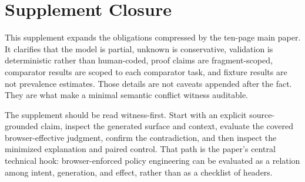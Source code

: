 \documentclass[10pt,conference]{IEEEtran}
\begin{document}
\section{Supplement Closure}

This supplement expands the obligations compressed by the ten-page main paper. It clarifies that the model is partial, unknown is conservative, validation is deterministic rather than human-coded, proof claims are fragment-scoped, comparator results are scoped to each comparator task, and fixture results are not prevalence estimates. Those details are not caveats appended after the fact. They are what make a minimal semantic conflict witness auditable.

The supplement should be read witness-first. Start with an explicit source-grounded claim, inspect the generated surface and context, evaluate the covered browser-effective judgment, confirm the contradiction, and then inspect the minimized explanation and paired control. That path is the paper's central technical hook: browser-enforced policy engineering can be evaluated as a relation among intent, generation, and effect, rather than as a checklist of headers.
\end{document}
